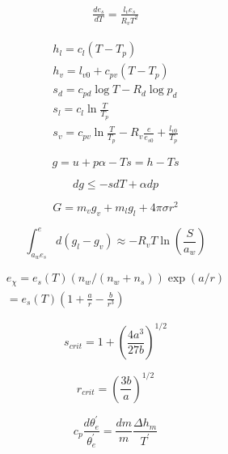 \documentclass[12pt]{article}
\begin{document}
\begin{multicols}{2}
\begin{gather}
  \frac{de_s }{dT} = \frac{l_v e_s}{R_v T^2} 
\end{gather}


\begin{subequations}
  \begin{eqnarray}
  h_l = c_l (T - T_p) \\
 h_v = l_{v0} + c_{pv} ( T - T_p) \\
s_d = c_{pd} \log T - R_d \log p_d\\
 s_l = c_l \ln \frac{T }{T_p}  \\
 s_v = c_{pv} \ln \frac{T }{T_p} - R_v \frac{e }{e_{s0}} + \frac{l_{v0} }{T_p}  
\label{eq:sref}
  \end{eqnarray}
\end{subequations}


  \begin{equation}
  g = u + p\alpha - Ts = h - Ts
  \end{equation}

  \begin{equation}
    \label{eq:dg}
    dg \leq -s dT + \alpha dp
  \end{equation}


  \begin{equation}
    \label{eq:G}
    G = m_v g_v + m_l g_l + 4 \pi \sigma r^2
  \end{equation}

  \begin{equation}
    \label{eq:newint}
    \int_{a_w e_s}^e  d(g_l - g_v) \approx  - R_v T\ln \left (
      \frac{S}{a_w} \right )
  \end{equation}



\begin{multline}
  \label{equil}
  e_{\chi} = e_s(T)(n_w/(n_w + n_s))\exp(a/r) \\
  = e_s(T)(1 + \frac{a}{r} - \frac{b}{r^3})
\end{multline}

\begin{equation}
  \label{eq:sscrit}
  s_{crit}= 1 + \left ( \frac{4 a^3}{27 b} \right )^{1/2}
\end{equation}

\begin{equation}
  \label{eq:rcrit}
  r_{crit} = \left ( \frac{3b}{a} \right )^{1/2}
\end{equation}

\begin{equation}
  \label{eq:2ndb}
  c_p \frac{d\theta_e^\prime}{\theta_e^\prime} = 
          \frac{dm}{m} \frac{\Delta h_m}{T^\prime}
\end{equation}


\end{multicols}
\end{document}

